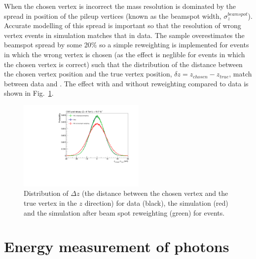 When the chosen vertex is incorrect the mass resolution is dominated by the spread in position of the pileup vertices (known as the beamspot width, $\sigma_{z}^{beamspot}$). Accurate modelling of this spread is important so that the resolution of wrong vertex events in simulation matches that in data. The \MC sample overestimates the beamspot spread by some 20\% so a simple reweighting is implemented for \MC events in which the wrong vertex is chosen (as the effect is neglible for events in which the chosen vertex is correct) such that the distribution of the distance between the chosen vertex position and the true vertex position, $\delta z=z_{chosen}-z_{true}$, match between data and \MC. The effect with and without reweighting compared to data is shown in Fig.~\ref{fig:beamspot}.

\begin{figure}
  \begin{center}
  \includegraphics[width=0.55\textwidth]{analysis_comps/plots/beamspot.pdf}
  \caption[Distribution of $\Delta z$ (the distance between the chosen vertex and the true vertex in the $z$ direction]{Distribution of $\Delta z$ (the distance between the chosen vertex and the true vertex in the $z$ direction) for data (black), the \MC simulation (red) and the \MC simulation after beam spot reweighting (green) for \Zmumu events.}
  \label{fig:beamspot}
  \end{center}
\end{figure}

\section{Energy measurement of photons}
\label{sec:photon_energy}

